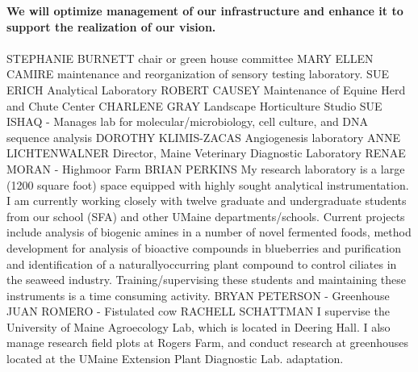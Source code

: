 \documentclass[11pt]{article}
\begin{document}
\begin{description}[topsep=0pt, noitemsep]
\begin{description}[topsep=11pt, noitemsep]
\item[\textbf{2.2}] \textbf{We will optimize management of our infrastructure and enhance it to support the realization of our vision.}\\~\\
	STEPHANIE BURNETT chair or green house committee
	MARY ELLEN CAMIRE maintenance and reorganization of sensory testing laboratory.
	SUE ERICH Analytical Laboratory
	ROBERT CAUSEY Maintenance of Equine Herd and Chute Center
	CHARLENE GRAY Landscape Horticulture Studio
	SUE ISHAQ - Manages lab for molecular/microbiology, cell culture, and DNA sequence analysis
	DOROTHY KLIMIS-ZACAS Angiogenesis laboratory
	ANNE LICHTENWALNER Director, Maine Veterinary Diagnostic Laboratory
	RENAE MORAN - Highmoor Farm
BRIAN PERKINS My research laboratory is a large (1200 square foot) space equipped with highly sought analytical instrumentation. I am currently working closely with twelve graduate and undergraduate students from our school (SFA) and other UMaine departments/schools. Current projects include analysis of biogenic amines in a number of novel fermented foods, method development for analysis of bioactive compounds in blueberries and purification and identification of a naturallyoccurring plant compound to control ciliates in the seaweed industry. Training/supervising these students and maintaining these instruments is a time consuming
activity.
BRYAN PETERSON - Greenhouse
JUAN ROMERO - Fistulated cow
RACHELL SCHATTMAN I supervise the University of Maine Agroecology Lab, which is located in Deering Hall. I also manage research field plots at Rogers Farm, and conduct research at greenhouses located at the UMaine Extension Plant Diagnostic Lab.  adaptation.

\end{description}
\end{description}
\end{document}
